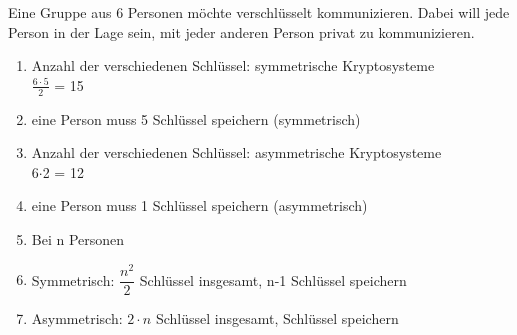 Eine Gruppe aus 6 Personen möchte verschlüsselt kommunizieren. Dabei will jede Person in der Lage sein, mit jeder anderen Person privat zu kommunizieren.
\begin{enumerate}
	\item Anzahl der verschiedenen Schlüssel: symmetrische Kryptosysteme \\
	$\frac{6\cdot5}{2}$ = 15
	\item eine Person muss 5 Schlüssel speichern (symmetrisch)
	\item Anzahl der verschiedenen Schlüssel: asymmetrische Kryptosysteme \\
	6$\cdot$2 = 12
	\item eine Person muss 1 Schlüssel speichern (asymmetrisch)
	\item Bei n Personen
	\item[] Symmetrisch: $\dfrac{n^2}{2}$ Schlüssel insgesamt, \quad n-1 Schlüssel speichern
	\item[]  Asymmetrisch: $2 \cdot n$ Schlüssel insgesamt,  Schlüssel speichern
\end{enumerate}








